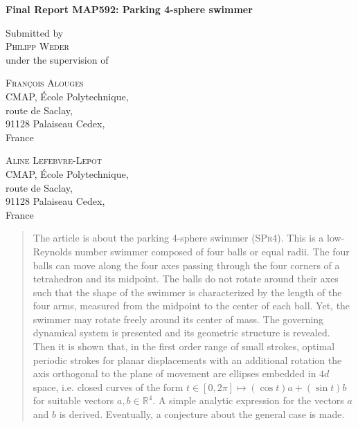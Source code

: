 \documentclass[10pt,a4paper]{article}
\author{Philipp Weder}
\date{}
\numberwithin{equation}{section}
\theoremstyle{plain}
\theoremstyle{plain}
\theoremstyle{plain}
\theoremstyle{remark}
\theoremstyle{definition}
\theoremstyle{definition}
\theoremstyle{plain}
\theoremstyle{plain}
\newcommand{\R}{\mathbb{R}}
\newcommand{\spr}{\textsc{SPr4}}
\begin{document}
\thispagestyle{plain}
\begin{center}
\begin{Large}
\textbf{Final Report MAP592: Parking 4-sphere swimmer}\\
\end{Large}
\vspace{1em}
Submitted by\\
\textsc{Philipp Weder}\\
under the supervision of\\
\end{center}
\vspace{1em}
\begin{minipage}[t]{0.5\textwidth}
\begin{center}
\textsc{François Alouges}\\
CMAP, École Polytechnique,\\
route de Saclay,\\
91128 Palaiseau Cedex,\\
France
\end{center}
\end{minipage}
\begin{minipage}[t]{0.5\textwidth}
\begin{center}
\textsc{Aline Lefebvre-Lepot}\\
CMAP, École Polytechnique,\\
route de Saclay,\\
91128 Palaiseau Cedex,\\
France
\end{center}
\end{minipage}

\begin{abstract}
The article is about the parking 4-sphere swimmer (\spr). This is a low-Reynolds number swimmer composed of four balls or equal radii. The four balls can move along the four axes passing through the four corners of a tetrahedron and its midpoint. The balls do not rotate around their axes such that the shape of the swimmer is characterized by the length of the four arms, measured from the midpoint to the center of each ball. Yet, the swimmer may rotate freely around its center of mass. The governing dynamical system is presented and its geometric structure is revealed. Then it is shown that, in the first order range of small strokes, optimal periodic strokes for planar displacements with an additional rotation the axis orthogonal to the plane of movement are ellipses embedded in $4d$ space, i.e. closed curves of the form $t \in [0, 2 \pi] \mapsto (\cos t) a + (\sin t) b$ for suitable vectors $a, b \in \R^4$. A simple analytic expression for the vectors $a$ and $b$ is derived. Eventually, a conjecture about the general case is made.
\end{abstract}
\end{document}
